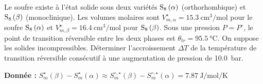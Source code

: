 \begin{exercise}

Le soufre existe à l’état solide sous deux variétés $\ce{S_8 (\alpha)}$ (orthorhombique) et $\ce{S_8 (\beta)}$ (monoclinique). Les volumes molaires sont $V^\star_{m,\alpha} = 15.3 ~ \si{\centi\meter\cubed\per\mole}$ pour le soufre $\ce{S_8 (\alpha)}$ et $V^\star_{m,\beta} = 16.4 ~ \si{\centi\meter\cubed\per\mole}$ pour $\ce{S_8 (\beta)}$. Sous une pression $P=P^\circ$, le point de transition réversible entre les deux phases est $\theta_{tr} = 95.5 ~ \si{\celsius}$. On suppose les solides incompressibles. Déterminer l’accroissement $\Delta T$ de la température de transition réversible consécutif à une augmentation de pression de \SI{10.0}{\bar}.

\textbf{Donnée :} $S_m^\star (\beta) - S_m^\star (\alpha) \approx  S_m^{\circ, \star} (\beta) - S_m^{\circ, \star} (\alpha) = 7.87 ~ \si{\joule\per\mole\per\kelvin}$

\end{exercise}